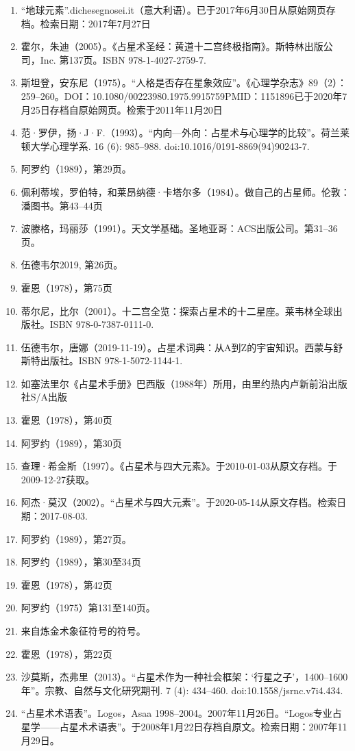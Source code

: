 \begin{enumerate}
\item “地球元素”.dichesegnosei.it（意大利语）。已于2017年6月30日从原始网页存档。检索日期：2017年7月27日
\item 霍尔，朱迪（2005）。《占星术圣经：黄道十二宫终极指南》。斯特林出版公司，Inc. 第137页。ISBN 978-1-4027-2759-7.
\item 斯坦登，安东尼（1975）。“人格是否存在星象效应”。《心理学杂志》89（2）：259–260。DOI：10.1080/00223980.1975.9915759PMID：1151896已于2020年7月25日存档自原始网页。检索于2011年11月20日
\item 范·罗伊，扬·J·F.（1993）。“内向—外向：占星术与心理学的比较”。荷兰莱顿大学心理学系. 16 (6): 985–988. doi:10.1016/0191-8869(94)90243-7.
\item 阿罗约（1989），第29页。
\item 佩利蒂埃，罗伯特，和莱昂纳德·卡塔尔多（1984）。做自己的占星师。伦敦：潘图书。第43–44页
\item 波滕格，玛丽莎（1991）。天文学基础。圣地亚哥：ACS出版公司。第31–36页。
\item 伍德韦尔2019, 第26页。
\item 霍恩（1978），第75页
\item 蒂尔尼，比尔（2001）。十二宫全览：探索占星术的十二星座。莱韦林全球出版社。ISBN 978-0-7387-0111-0.
\item 伍德韦尔，唐娜（2019-11-19）。占星术词典：从A到Z的宇宙知识。西蒙与舒斯特出版社。ISBN 978-1-5072-1144-1.
\item 如塞法里尔《占星术手册》巴西版（1988年）所用，由里约热内卢新前沿出版社S/A出版
\item 霍恩（1978），第40页
\item 阿罗约（1989），第30页
\item 查理·希金斯（1997）。《占星术与四大元素》。于2010-01-03从原文存档。于2009-12-27获取。
\item 阿杰·莫汉（2002）。“占星术与四大元素”。于2020-05-14从原文存档。检索日期：2017-08-03.
\item 阿罗约（1989），第27页。
\item 阿罗约（1989），第30至34页
\item 霍恩（1978），第42页
\item 阿罗约（1975）第131至140页。
\item 来自炼金术象征符号的符号。
\item 霍恩（1978），第22页
\item 沙莫斯，杰弗里（2013）。“占星术作为一种社会框架：‘行星之子’，1400–1600年”。宗教、自然与文化研究期刊. 7 (4): 434–460. doi:10.1558/jsrnc.v7i4.434.
\item “占星术术语表”。Logos，Asaa 1998–2004。2007年11月26日。“Logos专业占星学——占星术术语表”。于2008年1月22日存档自原文。检索日期：2007年11月29日。

\end{enumerate}
